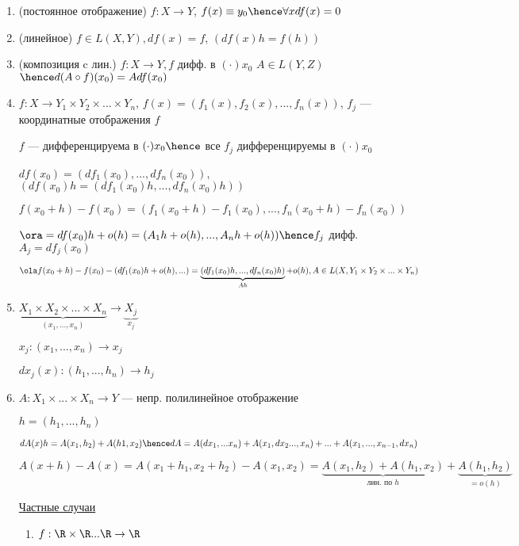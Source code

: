 \begin{examples}
\begin{enumerate}
    \item (постоянное отображение) $f: X \to Y$, $f(x) \equiv y_0 \hence \forall x df(x) = 0$
    \item (линейное) $f \in L(X, Y), df(x) = f$, $(df(x)h = f(h))$
    \item (композиция c лин.) $f : X \to Y, f$ дифф. в $(\cdot) x_0$ $A \in L(Y, Z)$ 
        $ \hence d(A \circ f)(x_0) = Adf(x_0)$
    \item $f : X \to Y_1 \times Y_2 \times ... \times Y_n$, $f(x) = (f_1(x), f_2(x), ..., f_n(x))$, $f_j$ --- координатные отображения $f$
    
    $f$ --- дифференцируема в $(\cdot) x_0 \hence $ все $f_j $ дифференцируемы в $(\cdot) x_0$

    $df(x_0) = (df_1(x_0), ..., df_n(x_0))$, $\left( df(x_0)h = (df_1(x_0)h, ..., df_n(x_0)h) \right)$

    $f(x_0 + h) - f(x_0) = (f_1(x_0 + h) - f_1(x_0), ... , f_n(x_0 + h) - f_n(x_0))$

    $\ora = df(x_0)h + o(h) = (A_1h + o(h), ... , A_nh + o(h)) \hence f_j$ дифф. $A_j = df_j(x_0)$

    $\ola f(x_0 + h) - f(x_0) - (df_1(x_0)h + o(h), ... ) = \underbrace{(df_1(x_0) h, ... , df_n(x_0) h)}_{Ah} + o(h), A \in L(X, Y_1 \times Y_2 \times ... \times Y_n)$


    \item $\underbrace{X_1 \times X_2 \times ... \times X_n }_{(x_1, ... , x_n)}\to \underbrace{X_j}_{x_j}$
    
    $x_j : (x_1, ..., x_n) \to x_j$

    $dx_j(x) : (h_1, ..., h_n) \to h_j$
            
    \item $A : X_1 \times ... \times X_n \to Y$ --- непр. полилинейное отображение
    
    $h = (h_1, ..., h_n)$

    $dA(x)h = A(x_1, h_2) + A(h1, x_2) \hence dA = A(dx_1, ... x_n) + A(x_1, dx_2 ..., x_n) + ... + A(x_1, ..., x_{n- 1}, dx_n)$

    $A(x + h) - A(x) = A(x_1 + h_1, x_2 + h_2) - A(x_1, x_2) = \underbrace{A(x_1, h_2) + A(h_1, x_2)}_{\text{лин. по } h} + \underbrace{A(h_1, h_2)}_{=o(h)}$

    \underline{Частные случаи} 

    \begin{enumerate}
        \item $f : \R \times \R ... \R \to \R$
        

\end{enumerate}
\end{enumerate}
\end{examples}

